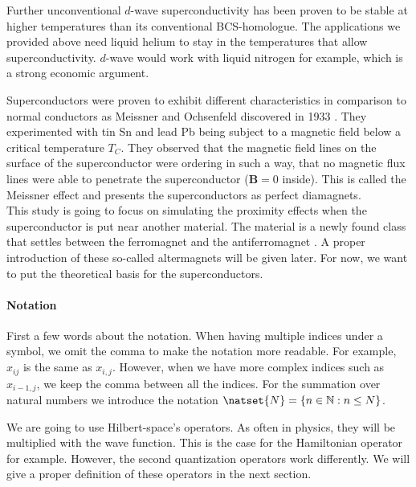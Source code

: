 \documentclass[../main.tex]{subfile}
\begin{document}
Further unconventional $d$-wave superconductivity has been proven to be stable at higher temperatures than its conventional BCS-homologue.
The applications we provided above need liquid helium to stay in the temperatures that allow superconductivity. $d$-wave
would work with liquid nitrogen for example, which is a strong economic argument.

Superconductors were proven to exhibit different characteristics in comparison to normal conductors as
Meissner and Ochsenfeld discovered in 1933 \cite{MeissnerOchsenfeld1933}. 
They experimented with tin Sn and lead Pb being subject to a magnetic field below a critical temperature $T_C$. They observed that the magnetic field lines on the surface
of the superconductor were ordering in such a way, that no magnetic flux lines were able to penetrate the superconductor ($\bm{B} = 0$ inside). This is called the Meissner effect
and presents the superconductors as perfect diamagnets.\\

This study is going to focus on simulating the proximity effects when the superconductor is put near another material. The material is a newly found class 
that settles between the ferromagnet and the antiferromagnet \cite{Smejkal2022}. A proper introduction of these so-called altermagnets will be given later.
For now, we want to put the theoretical basis for the superconductors.\\

\paragraph{Notation}$~$\\

First a few words about the notation. When having multiple indices under a symbol, we omit the comma to make the notation more readable. 
For example, $x_{ij}$ is the same as $x_{i,j}$. However, when we have more complex indices such as $x_{i-1, j}$, we keep the comma between all
the indices. For the summation over natural numbers we introduce the notation $\natset{N} = \{n \in \mathbb{N}: n\leq N\}$.

We are going to use Hilbert-space's operators. As often in physics, they will be multiplied with the wave function. This is the case for the Hamiltonian 
operator for example. However, the second quantization operators work differently. We will give a proper definition of these operators in the next section.\\
\end{document}
